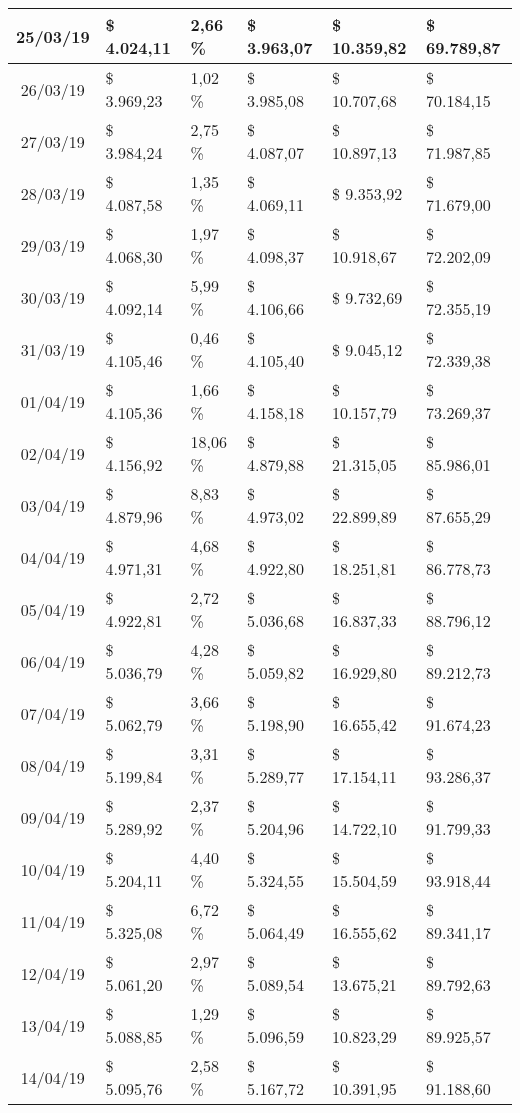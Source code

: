 \begin{small}
\begin{longtable}{|c|l|l|l|l|l|}
25/03/19 & \$ 4.024,11 & 2,66 \% & \$ 3.963,07 & \$ 10.359,82 & \$ 69.789,87 \\ \hline
26/03/19 & \$ 3.969,23 & 1,02 \% & \$ 3.985,08 & \$ 10.707,68 & \$ 70.184,15 \\ \hline
27/03/19 & \$ 3.984,24 & 2,75 \% & \$ 4.087,07 & \$ 10.897,13 & \$ 71.987,85 \\ \hline
28/03/19 & \$ 4.087,58 & 1,35 \% & \$ 4.069,11 & \$ 9.353,92 & \$ 71.679,00 \\ \hline
29/03/19 & \$ 4.068,30 & 1,97 \% & \$ 4.098,37 & \$ 10.918,67 & \$ 72.202,09 \\ \hline
30/03/19 & \$ 4.092,14 & 5,99 \% & \$ 4.106,66 & \$ 9.732,69 & \$ 72.355,19 \\ \hline
31/03/19 & \$ 4.105,46 & 0,46 \% & \$ 4.105,40 & \$ 9.045,12 & \$ 72.339,38 \\ \hline
01/04/19 & \$ 4.105,36 & 1,66 \% & \$ 4.158,18 & \$ 10.157,79 & \$ 73.269,37 \\ \hline
02/04/19 & \$ 4.156,92 & 18,06 \% & \$ 4.879,88 & \$ 21.315,05 & \$ 85.986,01 \\ \hline
03/04/19 & \$ 4.879,96 & 8,83 \% & \$ 4.973,02 & \$ 22.899,89 & \$ 87.655,29 \\ \hline
04/04/19 & \$ 4.971,31 & 4,68 \% & \$ 4.922,80 & \$ 18.251,81 & \$ 86.778,73 \\ \hline
05/04/19 & \$ 4.922,81 & 2,72 \% & \$ 5.036,68 & \$ 16.837,33 & \$ 88.796,12 \\ \hline
06/04/19 & \$ 5.036,79 & 4,28 \% & \$ 5.059,82 & \$ 16.929,80 & \$ 89.212,73 \\ \hline
07/04/19 & \$ 5.062,79 & 3,66 \% & \$ 5.198,90 & \$ 16.655,42 & \$ 91.674,23 \\ \hline
08/04/19 & \$ 5.199,84 & 3,31 \% & \$ 5.289,77 & \$ 17.154,11 & \$ 93.286,37 \\ \hline
09/04/19 & \$ 5.289,92 & 2,37 \% & \$ 5.204,96 & \$ 14.722,10 & \$ 91.799,33 \\ \hline
10/04/19 & \$ 5.204,11 & 4,40 \% & \$ 5.324,55 & \$ 15.504,59 & \$ 93.918,44 \\ \hline
11/04/19 & \$ 5.325,08 & 6,72 \% & \$ 5.064,49 & \$ 16.555,62 & \$ 89.341,17 \\ \hline
12/04/19 & \$ 5.061,20 & 2,97 \% & \$ 5.089,54 & \$ 13.675,21 & \$ 89.792,63 \\ \hline
13/04/19 & \$ 5.088,85 & 1,29 \% & \$ 5.096,59 & \$ 10.823,29 & \$ 89.925,57 \\ \hline
14/04/19 & \$ 5.095,76 & 2,58 \% & \$ 5.167,72 & \$ 10.391,95 & \$ 91.188,60 \\ \hline

\end{longtable}
\end{small}
